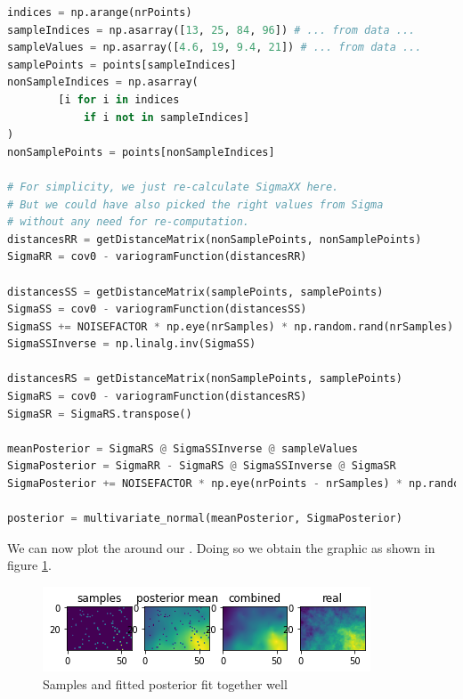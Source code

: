 \begin{lstlisting}[language=python]
indices = np.arange(nrPoints)
sampleIndices = np.asarray([13, 25, 84, 96]) # ... from data ...
sampleValues = np.asarray([4.6, 19, 9.4, 21]) # ... from data ...
samplePoints = points[sampleIndices]
nonSampleIndices = np.asarray(
        [i for i in indices 
            if i not in sampleIndices]
)
nonSamplePoints = points[nonSampleIndices]

# For simplicity, we just re-calculate SigmaXX here.
# But we could have also picked the right values from Sigma
# without any need for re-computation.
distancesRR = getDistanceMatrix(nonSamplePoints, nonSamplePoints)
SigmaRR = cov0 - variogramFunction(distancesRR)

distancesSS = getDistanceMatrix(samplePoints, samplePoints)
SigmaSS = cov0 - variogramFunction(distancesSS)
SigmaSS += NOISEFACTOR * np.eye(nrSamples) * np.random.rand(nrSamples) # To make inverse possible
SigmaSSInverse = np.linalg.inv(SigmaSS)

distancesRS = getDistanceMatrix(nonSamplePoints, samplePoints)
SigmaRS = cov0 - variogramFunction(distancesRS)
SigmaSR = SigmaRS.transpose()

meanPosterior = SigmaRS @ SigmaSSInverse @ sampleValues
SigmaPosterior = SigmaRR - SigmaRS @ SigmaSSInverse @ SigmaSR
SigmaPosterior += NOISEFACTOR * np.eye(nrPoints - nrSamples) * np.random.rand(nrPoints - nrSamples)  # To make inverse possible

posterior = multivariate_normal(meanPosterior, SigmaPosterior)   
\end{lstlisting}

We can now plot the  around our . Doing so we obtain the graphic as shown in figure \ref{gpPosterior}.

\begin{figure}[H]
  \centering
  \includegraphics[width=0.7\linewidth]{images/gp_posterior_samples.png}
  \caption{Samples and fitted posterior fit together well}
  \label{gpPosterior}
\end{figure}


